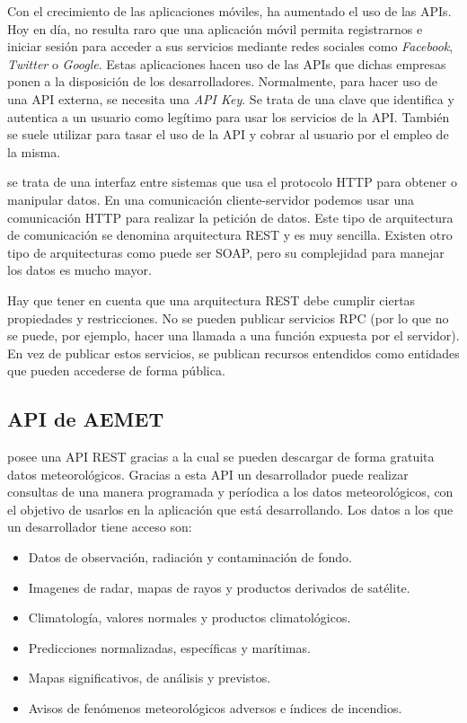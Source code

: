 Con el crecimiento de las aplicaciones móviles, ha aumentado el uso de las \ac{API}s. Hoy en día, no resulta raro que una aplicación móvil permita registrarnos e iniciar sesión para acceder a sus servicios mediante redes sociales como \textit{Facebook}, \textit{Twitter} o \textit{Google}. Estas aplicaciones hacen uso de las \ac{API}s que dichas empresas ponen a la disposición de los desarrolladores. Normalmente, para hacer uso de una \ac{API} externa, se necesita una \textit{\ac{API} Key}. Se trata de una clave que identifica y autentica a un usuario como legítimo para usar los servicios de la \ac{API}. También se suele utilizar para tasar el uso de la \ac{API} y cobrar al usuario por el empleo de la misma.

 se trata de una interfaz entre sistemas que usa el protocolo \ac{HTTP} para obtener o manipular datos. En una comunicación cliente-servidor podemos usar una comunicación \ac{HTTP} para realizar la petición de datos. Este tipo de arquitectura de comunicación se denomina arquitectura \ac{REST} y es muy sencilla. Existen otro tipo de arquitecturas como puede ser \ac{SOAP}, pero su complejidad para manejar los datos es mucho mayor.

Hay que tener en cuenta que una arquitectura \ac{REST} debe cumplir ciertas propiedades y restricciones. No se pueden publicar servicios \ac{RPC} (por lo que no se puede, por ejemplo, hacer una llamada a una función expuesta por el servidor). En vez de publicar estos servicios, se publican recursos entendidos como entidades que pueden accederse de forma pública. 

\subsection{\ac{API} de \ac{AEMET}}

 \cite{39} posee una \ac{API} \ac{REST} gracias a la cual se pueden descargar de forma gratuita datos meteorológicos. Gracias a esta \ac{API} un desarrollador puede realizar consultas de una manera programada y períodica a los datos meteorológicos, con el objetivo de usarlos en la aplicación que está desarrollando. Los datos a los que un desarrollador tiene acceso son:

\begin{itemize}
\item Datos de observación, radiación y contaminación de fondo.
\item Imagenes de radar, mapas de rayos y productos derivados de satélite.
\item Climatología, valores normales y productos climatológicos.
\item Predicciones normalizadas, específicas y marítimas.
\item Mapas significativos, de análisis y previstos.
\item Avisos de fenómenos meteorológicos adversos e índices de incendios.
\end{itemize}

